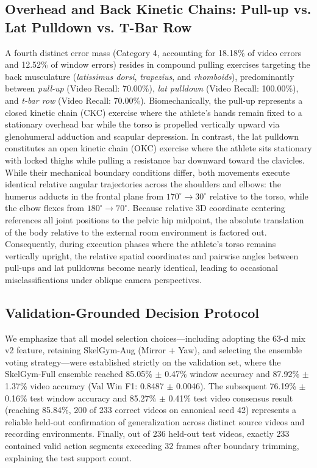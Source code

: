 \documentclass[preprint,12pt]{elsarticle}
\begin{document}
\subsection{Overhead and Back Kinetic Chains: Pull-up vs. Lat Pulldown vs. T-Bar Row}
A fourth distinct error mass (Category 4, accounting for 18.18\% of video errors and 12.52\% of window errors) resides in compound pulling exercises targeting the back musculature (\textit{latissimus dorsi}, \textit{trapezius}, and \textit{rhomboids}), predominantly between \textit{pull-up} (Video Recall: 70.00\%), \textit{lat pulldown} (Video Recall: 100.00\%), and \textit{t-bar row} (Video Recall: 70.00\%).
Biomechanically, the pull-up represents a closed kinetic chain (CKC) exercise where the athlete's hands remain fixed to a stationary overhead bar while the torso is propelled vertically upward via glenohumeral adduction and scapular depression. In contrast, the lat pulldown constitutes an open kinetic chain (OKC) exercise where the athlete sits stationary with locked thighs while pulling a resistance bar downward toward the clavicles. While their mechanical boundary conditions differ, both movements execute identical relative angular trajectories across the shoulders and elbows: the humerus adducts in the frontal plane from $170^\circ \to 30^\circ$ relative to the torso, while the elbow flexes from $180^\circ \to 70^\circ$. Because relative 3D coordinate centering references all joint positions to the pelvic hip midpoint, the absolute translation of the body relative to the external room environment is factored out. Consequently, during execution phases where the athlete's torso remains vertically upright, the relative spatial coordinates and pairwise angles between pull-ups and lat pulldowns become nearly identical, leading to occasional misclassifications under oblique camera perspectives.

\subsection{Validation-Grounded Decision Protocol}\label{sec:val_protocol}
We emphasize that all model selection choices---including adopting the 63-d mix v2 feature, retaining SkelGym-Aug (Mirror + Yaw), and selecting the ensemble voting strategy---were established strictly on the validation set, where the SkelGym-Full ensemble reached 85.05\% $\pm$ 0.47\% window accuracy and 87.92\% $\pm$ 1.37\% video accuracy (Val Win F1: 0.8487 $\pm$ 0.0046). The subsequent 76.19\% $\pm$ 0.16\% test window accuracy and 85.27\% $\pm$ 0.41\% test video consensus result (reaching 85.84\%, 200 of 233 correct videos on canonical seed 42) represents a reliable held-out confirmation of generalization across distinct source videos and recording environments. Finally, out of 236 held-out test videos, exactly 233 contained valid action segments exceeding 32 frames after boundary trimming, explaining the test support count.
\end{document}
